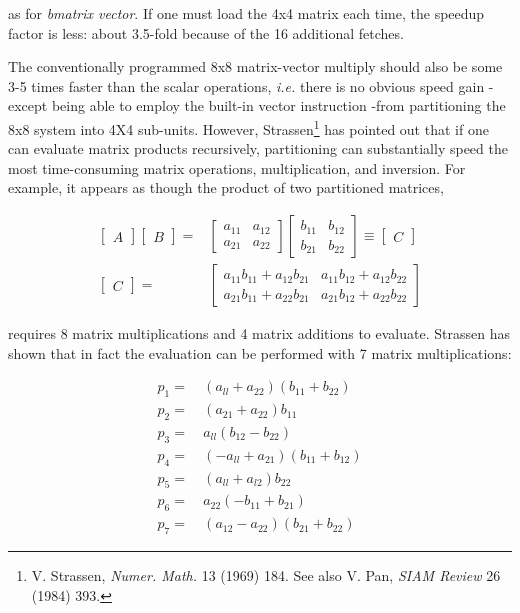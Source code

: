 as for \textit{bmatrix vector}. If one must load the 4x4 matrix each time, the speedup factor is less: about 3.5-fold because of the 16 additional fetches.

The conventionally programmed 8x8 matrix-vector multiply should also be some 3-5 times faster than the scalar operations, \textit{i.e.} there is no obvious speed gain -except being able to employ the built-in vector instruction  -from partitioning the 8x8 system into 4X4 sub-units. However, Strassen\footnote{V. Strassen, \textit{Numer. Math.} 13 (1969) 184. See also V. Pan, \textit{SIAM Review} 26 (1984) 393.} has pointed out that if one can evaluate matrix products recursively, partitioning can substantially speed the most time-consuming matrix operations, multiplication, and inversion. For example, it appears as though the product of two partitioned matrices,

\begin{align}
    \begin{bmatrix}A\end{bmatrix}
    \begin{bmatrix}B\end{bmatrix} =& 
    \begin{bmatrix}
      a_{11} & a_{12} \\
      a_{21} & a_{22}
    \end{bmatrix}
    \begin{bmatrix}
      b_{11} & b_{12} \\
      b_{21} & b_{22}
    \end{bmatrix}
    \equiv
    \begin{bmatrix}C\end{bmatrix} \\
    \begin{bmatrix}C\end{bmatrix} =&
    \begin{bmatrix}
      a_{11}b_{11}+a_{12}b_{21} & a_{11}b_{12}+a_{12}b_{22} \\
      a_{21}b_{11}+a_{22}b_{21} & a_{21}b_{12}+a_{22}b_{22}
    \end{bmatrix}
\end{align}

requires 8 matrix multiplications and 4 matrix additions to evaluate. Strassen has shown that in fact the evaluation can be performed with 7 matrix multiplications:

\begin{align}
    p_{1} =&\ (a_{ll} + a_{22}) (b_{11} + b_{22})  \\
    p_{2} =&\ (a_{21} + a_{22}) b_{11}             \\
    p_{3} =&\ a_{ll} (b_{12} - b_{22})             \\
    p_{4} =&\ (-a_{ll} + a_{21}) (b_{11} + b_{12}) \\
    p_{5} =&\ (a_{ll} + a_{l2}) b_{22}             \\
    p_{6} =&\ a_{22} (-b_{11} + b_{21})            \\
    p_{7} =&\ (a_{12} - a_{22}) (b_{21} + b_{22})
\end{align}

